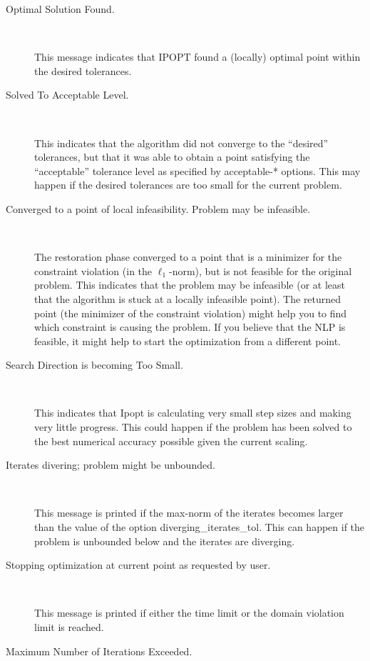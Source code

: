\begin{description}
\item[Optimal Solution Found.] ~

    This message indicates that IPOPT found a (locally) optimal point within the desired tolerances.

\item[Solved To Acceptable Level.] ~

    This indicates that the algorithm did not converge to the ``desired'' tolerances, but that it was able to obtain a point satisfying the ``acceptable'' tolerance level as specified by acceptable-* options.
    This may happen if the desired tolerances are too small for the current problem.

\item[Converged to a point of local infeasibility. Problem may be infeasible.] ~

    The restoration phase converged to a point that is a minimizer for the constraint violation (in the $\ell_1$-norm), but is not feasible for the original problem.
    This indicates that the problem may be infeasible (or at least that the algorithm is stuck at a locally infeasible point).
    The returned point (the minimizer of the constraint violation) might help you to find which constraint is causing the problem.
    If you believe that the NLP is feasible, it might help to start the optimization from a different point.

\item[Search Direction is becoming Too Small.] ~

    This indicates that Ipopt is calculating very small step sizes and making very little progress.
    This could happen if the problem has been solved to the best numerical accuracy possible given the current scaling.

\item[Iterates divering; problem might be unbounded.] ~

    This message is printed if the max-norm of the iterates becomes larger than the value of the option diverging\_iterates\_tol.
    This can happen if the problem is unbounded below and the iterates are diverging.

\item[Stopping optimization at current point as requested by user.] ~

    This message is printed if either the time limit or the domain violation limit is reached.

\item[Maximum Number of Iterations Exceeded.] ~


\end{description}
